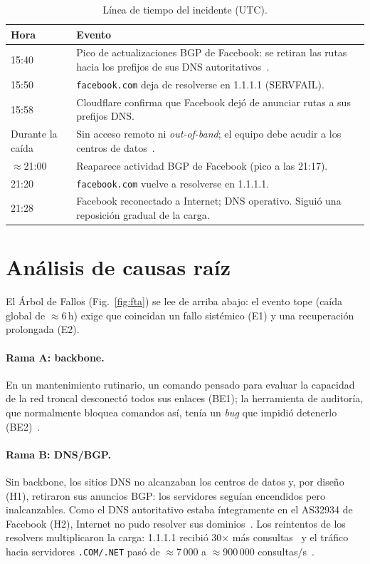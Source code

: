 \documentclass[10pt,a4paper]{article}
\begin{document}
\begin{table}[h]
\centering\footnotesize
\caption{Línea de tiempo del incidente (UTC).}\label{tab:linea}
\begin{tabularx}{\columnwidth}{@{}l X@{}}
\toprule
\textbf{Hora} & \textbf{Evento}\\\midrule
15:40 & Pico de actualizaciones BGP de Facebook: se retiran las rutas hacia los prefijos de sus DNS autoritativos~\cite{cloudflare2021facebook}.\\
15:50 & \texttt{facebook.com} deja de resolverse en 1.1.1.1 (SERVFAIL).\\
15:58 & Cloudflare confirma que Facebook dejó de anunciar rutas a sus prefijos DNS.\\
Durante la caída & Sin acceso remoto ni \textit{out-of-band}; el equipo debe acudir a los centros de datos~\cite{janardhan2021outage}.\\
$\approx$21:00 & Reaparece actividad BGP de Facebook (pico a las 21:17).\\
21:20 & \texttt{facebook.com} vuelve a resolverse en 1.1.1.1.\\
21:28 & Facebook reconectado a Internet; DNS operativo. Siguió una reposición gradual de la carga.\\
\bottomrule
\end{tabularx}
\end{table}

\section{Análisis de causas raíz}
El Árbol de Fallos (Fig.~\ref{fig:fta}) se lee de arriba abajo: el evento tope (caída global de $\approx$6\,h) exige que coincidan un fallo sistémico (E1) y una recuperación prolongada (E2).

\paragraph{Rama A: backbone.} En un mantenimiento rutinario, un comando pensado para evaluar la capacidad de la red troncal desconectó todos sus enlaces (BE1); la herramienta de auditoría, que normalmente bloquea comandos así, tenía un \textit{bug} que impidió detenerlo (BE2)~\cite{janardhan2021outage}.

\paragraph{Rama B: DNS/BGP.} Sin backbone, los sitios DNS no alcanzaban los centros de datos y, por diseño (H1), retiraron sus anuncios BGP: los servidores seguían encendidos pero inalcanzables. Como el DNS autoritativo estaba íntegramente en el AS32934 de Facebook (H2), Internet no pudo resolver sus dominios~\cite{janardhan2021outage,cloudflare2021facebook}. Los reintentos de los resolvers multiplicaron la carga: 1.1.1.1 recibió 30$\times$ más consultas~\cite{cloudflare2021facebook} y el tráfico hacia servidores \texttt{.COM/.NET} pasó de $\approx$7\,000 a $\approx$900\,000 consultas/s~\cite{rfc9520}.
\end{document}
